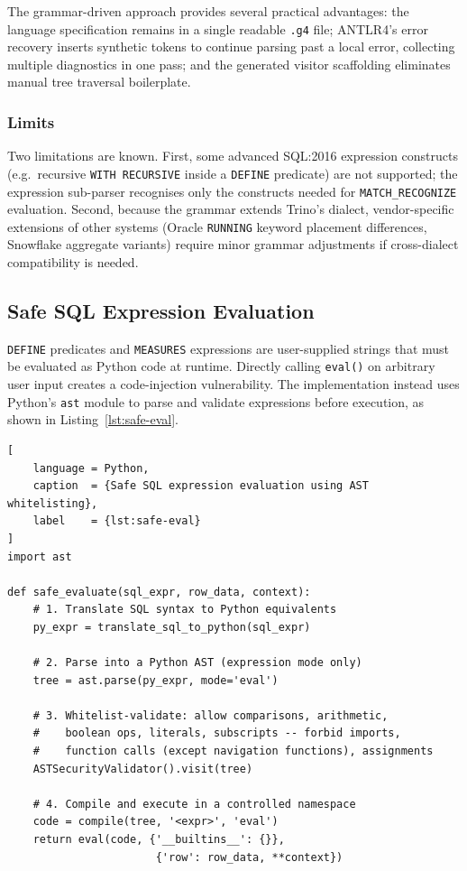 The grammar-driven approach provides several practical advantages:
the language specification remains in a single readable
\texttt{.g4} file; ANTLR4's error recovery inserts synthetic tokens
to continue parsing past a local error, collecting multiple
diagnostics in one pass; and the generated visitor scaffolding
eliminates manual tree traversal boilerplate.

\subsubsection{Limits}
\label{subsubsec:meth-parser-limits}

Two limitations are known.  First, some advanced SQL:2016 expression
constructs (e.g.\ recursive \texttt{WITH RECURSIVE} inside a
\texttt{DEFINE} predicate) are not supported; the expression
sub-parser recognises only the constructs needed for
\texttt{MATCH\_RECOGNIZE} evaluation.  Second, because the grammar
extends Trino's dialect, vendor-specific extensions of other
systems (Oracle \texttt{RUNNING} keyword placement differences,
Snowflake aggregate variants) require minor grammar adjustments if
cross-dialect compatibility is needed.

\subsection{Safe SQL Expression Evaluation}
\label{subsec:meth-safe-eval}

\texttt{DEFINE} predicates and \texttt{MEASURES} expressions are
user-supplied strings that must be evaluated as Python code at
runtime.  Directly calling \texttt{eval()} on arbitrary user input
creates a code-injection vulnerability.  The implementation instead
uses Python's \texttt{ast} module to parse and validate expressions
before execution, as shown in Listing~\ref{lst:safe-eval}.

\begin{lstlisting}[
    language = Python,
    caption  = {Safe SQL expression evaluation using AST whitelisting},
    label    = {lst:safe-eval}
]
import ast

def safe_evaluate(sql_expr, row_data, context):
    # 1. Translate SQL syntax to Python equivalents
    py_expr = translate_sql_to_python(sql_expr)

    # 2. Parse into a Python AST (expression mode only)
    tree = ast.parse(py_expr, mode='eval')

    # 3. Whitelist-validate: allow comparisons, arithmetic,
    #    boolean ops, literals, subscripts -- forbid imports,
    #    function calls (except navigation functions), assignments
    ASTSecurityValidator().visit(tree)

    # 4. Compile and execute in a controlled namespace
    code = compile(tree, '<expr>', 'eval')
    return eval(code, {'__builtins__': {}},
                       {'row': row_data, **context})
\end{lstlisting}


